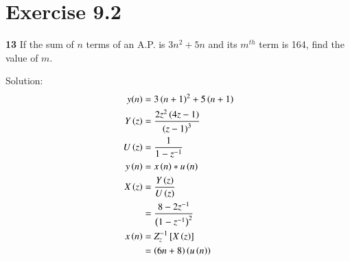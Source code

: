 \documentclass[journal,12pt,twocolumn]{IEEEtran}
\begin{document}


\vspace{3cm}

\title{}
\author{EE23BTECH11054 -  Sai Krishna Shanigarapu$^{*}$
}
\maketitle
\newpage
\bigskip


\section*{Exercise 9.2}

\noindent \textbf{13} \hspace{2pt}If the sum of $n$ terms of an A.P. is $3n^2+5n$ and its $m^{th}$ term is 164, find the value of $m$.
\bigskip

\noindent Solution:
\noindent
\begin{align}
y(n) &= 3\brak{n+1}^2 + 5\brak{n+1}\\
Y \brak{z} &= \frac{2z^2\brak{4z-1}}{\brak{z-1}^3}\\
U\brak{z} &= \frac{1}{1-z^{-1}}\\
y\brak{n} &= x\brak{n}*u\brak{n}\\
X\brak{z} &= \frac{Y\brak{z}}{U\brak{z}}\\
&= \frac{8-2z^{-1}}{\brak{1-z^{-1}}^2}\\ %
x\brak{n} &= Z_{z}^{-1}\left[X\brak{z}\right]\\
& = \brak{6n +8}\brak{u\brak{n}}
\end{align}
\end{document}
